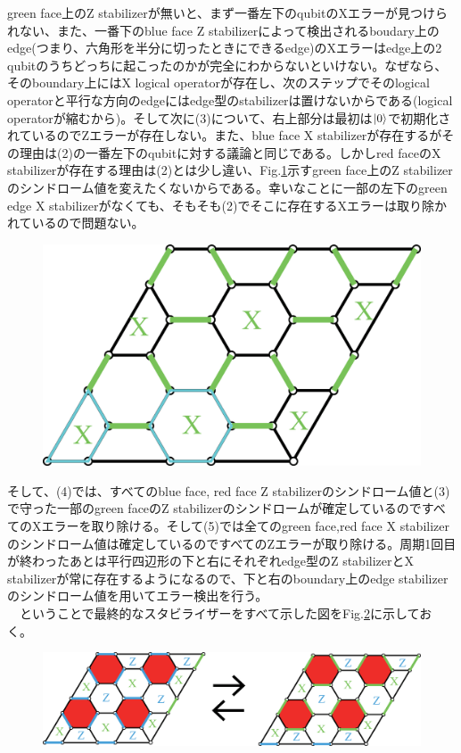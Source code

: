 \documentclass[a4paper,10pt]{ltjsarticle}
\begin{document}
{    green face上のZ stabilizerが無いと、まず一番左下のqubitのXエラーが見つけられない、また、一番下のblue face Z stabilizerによって検出されるboudary上のedge(つまり、六角形を半分に切ったときにできるedge)のXエラーはedge上の2 qubitのうちどっちに起こったのかが完全にわからないといけない。なぜなら、そのboundary上にはX logical operatorが存在し、次のステップでそのlogical operatorと平行な方向のedgeにはedge型のstabilizerは置けないからである(logical operatorが縮むから)。そして次に(3)について、右上部分は最初は$\ket{0}$で初期化されているのでZエラーが存在しない。また、blue face X stabilizerが存在するがその理由は(2)の一番左下のqubitに対する議論と同じである。しかしred faceのX stabilizerが存在する理由は(2)とは少し違い、Fig.\ref{figure9}示すgreen face上のZ stabilizerのシンドローム値を変えたくないからである。幸いなことに一部の左下のgreen edge X stabilizerがなくても、そもそも(2)でそこに存在するXエラーは取り除かれているので問題ない。
    
    \begin{figure}[h]
        \centering
        \includegraphics[scale=0.2]{figure/figure9.eps}
        \caption{ }
        \label{figure9}
    \end{figure}

    そして、(4)では、すべてのblue face, red face Z stabilizerのシンドローム値と(3)で守った一部のgreen faceのZ stabilizerのシンドロームが確定しているのですべてのXエラーを取り除ける。そして(5)では全てのgreen face,red face X stabilizerのシンドローム値は確定しているのですべてのZエラーが取り除ける。周期1回目が終わったあとは平行四辺形の下と右にそれぞれedge型のZ stabilizerとX stabilizerが常に存在するようになるので、下と右のboundary上のedge stabilizerのシンドローム値を用いてエラー検出を行う。\\
    　ということで最終的なスタビライザーをすべて示した図をFig.\ref{figure10}に示しておく。

    \begin{figure}[h]
        \centering
        \includegraphics[scale=0.25]{figure/figure10.eps}
        \caption{ }
        \label{figure10}
    \end{figure}

    
}
\end{document}
